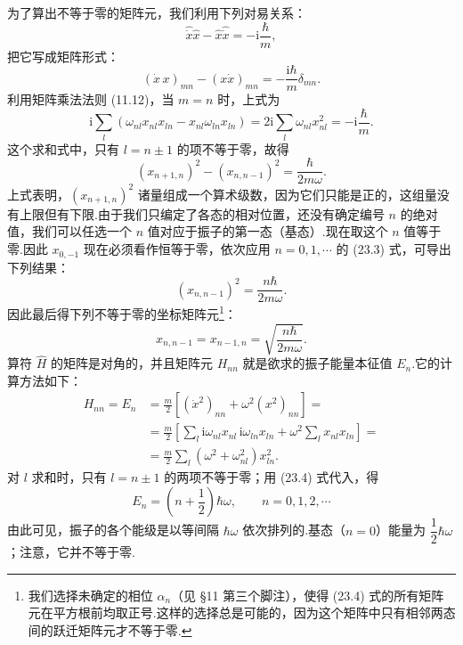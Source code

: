 为了算出不等于零的矩阵元，我们利用下列对易关系：
\begin{equation*}
  \hat{\dot{x}}\hat{x}-\hat{x}\hat{\dot{x}}=-\mathrm{i}\frac{\hbar}{m},
\end{equation*}
把它写成矩阵形式：
\begin{equation*}
  \left(\dot{x}\,x\right)_{mn}-\left(x\dot{x}\right)_{mn}
  =-\frac{\mathrm{i}\hbar}{m}\delta_{mn}.
\end{equation*}
利用矩阵乘法法则 (11.12)，当 $m=n$ 时，上式为
\begin{equation*}
  \mathrm{i}\sum_l\left(\omega_{nl}x_{nl}x_{ln}
  -x_{nl}\omega_{ln}x_{ln}\right)
  =2\mathrm{i}\sum_l\omega_{nl}x_{nl}^2
  =-\mathrm{i}\frac{\hbar}{m}.
\end{equation*}
这个求和式中，只有 $l=n\pm 1$ 的项不等于零，故得
\begin{equation}
  \left(x_{n+1,n}\right)^2-\left(x_{n,n-1}\right)^2
  =\frac{\hbar}{2m\omega}.
\end{equation}
上式表明，$\left(x_{n+1,n}\right)^2$ 诸量组成一个算术级数，因为它们只能是正的，这组量没有上限但有下限.由于我们只编定了各态的相对位置，还没有确定编号 $n$ 的绝对值，我们可以任选一个 $n$ 值对应于振子的第一态（基态）.现在取这个 $n$ 值等于零.因此 $x_{0,-1}$ 现在必须看作恒等于零，依次应用 $n=0,1,\cdots$ 的 (23.3) 式，可导出下列结果：
\begin{equation*}
  \left(x_{n,n-1}\right)^2=\frac{n\hbar}{2m\omega}.
\end{equation*}
因此最后得下列不等于零的坐标矩阵元\footnote{我们选择未确定的相位 $\alpha_n$（见 §11 第三个脚注），使得 (23.4) 式的所有矩阵元在平方根前均取正号.这样的选择总是可能的，因为这个矩阵中只有相邻两态间的跃迁矩阵元才不等于零.}：
\begin{equation}
  x_{n,n-1}=x_{n-1,n}=\sqrt{\frac{n\hbar}{2m\omega}}.
\end{equation}
算符 $\hat{H}$ 的矩阵是对角的，并且矩阵元 $H_{nn}$ 就是欲求的振子能量本征值 $E_n$.它的计算方法如下：
\begin{equation*}
\begin{aligned}
  H_{nn}=E_n
  &=\frac{m}{2}\left[\left(\dot{x}^2\right)_{nn}
  +\omega^2\left(x^2\right)_{nn}\right]=\\
  &=\frac{m}{2}\left[\sum_l\mathrm{i}\omega_{nl}x_{nl}\,\mathrm{i}\omega_{ln}x_{ln}
  +\omega^2\sum_l x_{nl}x_{ln}\right]=\\
  &=\frac{m}{2}\sum_l\left(\omega^2+\omega_{nl}^2\right)x_{ln}^2.
\end{aligned}
\end{equation*}
对 $l$ 求和时，只有 $l=n\pm 1$ 的两项不等于零；用 (23.4) 式代入，得
\begin{equation}
  E_n=\left(n+\frac{1}{2}\right)\hbar\omega,
  \qquad n=0,1,2,\cdots
\end{equation}
由此可见，振子的各个能级是以等间隔 $\hbar\omega$ 依次排列的.基态（$n=0$）能量为 $\dfrac{1}{2}\hbar\omega$；注意，它并不等于零.

